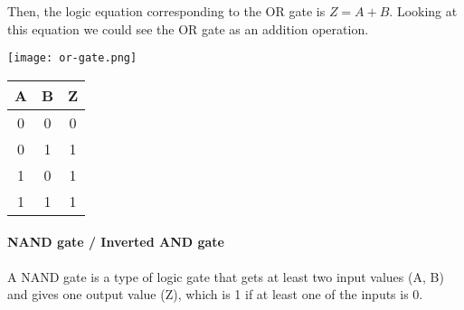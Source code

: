 Then, the logic equation corresponding to the OR gate is $Z = A + B$. Looking at this equation we could see the OR gate as an addition operation.

\begin{minipage}{\textwidth}
\vspace{1cm}
\begin{minipage}[c]{0.49\textwidth}
    \centering
    \texttt{[image: or-gate.png]}
\end{minipage}
\hfill
\begin{minipage}[c]{.49\textwidth}
    \centering
    \begin{tabular}{ |c|c|c| } \hline 
        \textbf{A} & \textbf{B} & \textbf{Z} \\ \hline
        0 & 0 & 0 \\
        0 & 1 & 1 \\
        1 & 0 & 1 \\
        1 & 1 & 1 \\
        \hline
    \end{tabular}
\end{minipage}
\end{minipage}



\paragraph{NAND gate / Inverted AND gate}
\begin{definition}
    A NAND gate is a type of logic gate that gets at least two input values (A, B) and gives one output value (Z), which is 1 if at least one of the inputs is 0.
\end{definition}

